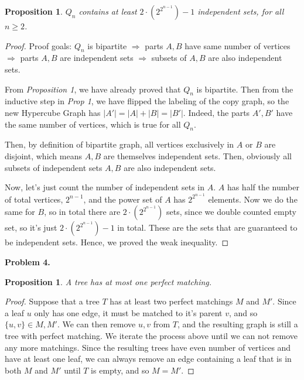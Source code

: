 \documentclass{article}
\newtheorem{prop}[thm]{Proposition}
\begin{document}
\begin{prop}
    $Q_n$ contains at least $2\cdot \left(2^{2^{n-1}}\right)-1$ independent sets, for all $n\ge 2$.
\end{prop}
\begin{proof}
    Proof goals: $Q_n$ is bipartite $\Rightarrow$ parts $A, B$ have same number of vertices $\Rightarrow$ parts $A, B$ are independent sets $\Rightarrow$ subsets of $A, B$ are also independent sets.

    From \emph{Proposition 1}, we have already proved that $Q_n$ is bipartite. 
    Then from the inductive step in \emph{Prop 1}, we have flipped the labeling of the copy graph, so the new Hypercube Graph has $|A'| = |A| + |B| = |B'|$. 
    Indeed, the parts $A', B'$ have the same number of vertices, which is true for all $Q_n$.

    Then, by definition of bipartite graph, all vertices exclusively in $A$ or $B$ are disjoint, which means $A, B$ are themselves independent sets. 
    Then, obviously all subsets of independent sets $A, B$ are also independent sets.

    Now, let's just count the number of independent sets in $A$. 
    $A$ has half the number of total vertices, $2^{n-1}$, and the power set of $A$ has $2^{2^{n-1}}$ elements.
    Now we do the same for $B$, so in total there are $2\cdot \left(2^{2^{n-1}}\right)$ sets, since we double counted empty set, so it's just $2\cdot \left(2^{2^{n-1}}\right)-1$ in total. 
    These are the sets that are guaranteed to be independent sets. Hence, we proved the weak inequality.
\end{proof}
\bigbreak

\textbf{Problem 4.}
\begin{prop}
    A tree has at most one perfect matching.
\end{prop}
\begin{proof}
    Suppose that a tree $T$ has at least two perfect matchings $M$ and $M'$. 
    Since a leaf $u$ only has one edge, it must be matched to it's parent $v$, and so $\{u, v\} \in M, M'$.
    We can then remove $u, v$ from $T$, and the resulting graph is still a tree with perfect matching.
    We iterate the process above until we can not remove any more matchings. Since the resulting trees have even number of vertices 
    and have at least one leaf, we can always remove an edge containing a leaf that is in both $M$ and $M'$ until $T$ is empty, and so $M = M'$.
\end{proof}
\end{document}
